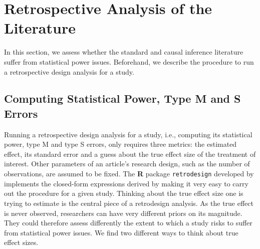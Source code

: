 \documentclass[12pt]{article}
\begin{document}
    



\section{Retrospective Analysis of the Literature}
    
    In this section, we assess whether the standard and causal inference literature suffer from statistical power issues. Beforehand, we describe the procedure to run a retrospective design analysis for a study. 
    
    \subsection{Computing Statistical Power, Type M and S Errors}

    Running a retrospective design analysis for a study, i.e., computing its statistical power, type M and type S errors, only requires three metrics: the estimated effect, its standard error and a guess about the true effect size of the treatment of interest. Other parameters of an article's research design, such as the number of observations, are assumed to be fixed. The \textbf{\textsf{R}} package \texttt{retrodesign} developed by \cite{timm_retrodesign_2019} implements the closed-form expressions derived by \cite{lu_note_2019} making it very easy to carry out the procedure for a given study. Thinking about the true effect size one is trying to estimate is the central piece of a retrodesign analysis. As the true effect is never observed, researchers can have very different priors on its magnitude. They could therefore assess differently the extent to which a study risks to suffer from statistical power issues. We find two different ways to think about true effect sizes.
\end{document}
